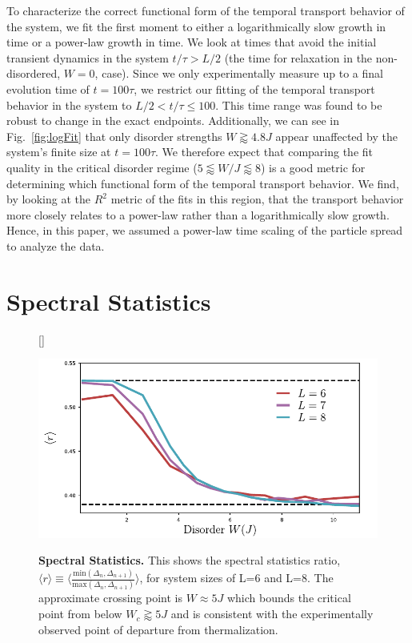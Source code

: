 To characterize the correct functional form of the temporal transport behavior of the system, we fit the first moment to either a logarithmically slow growth in time or a power-law growth in time. We look at times that avoid the initial transient dynamics in the system $t/\tau> L/2$ (the time for relaxation in the non-disordered, $W=0$, case). Since we only experimentally measure up to a final evolution time of $t=100\tau$, we restrict our fitting of the temporal transport behavior in the system to $L/2<t/\tau\leq100$. This time range was found to be robust to change in the exact endpoints. Additionally, we can see in Fig.~\ref{fig:logFit} that only disorder strengths $W\gtrapprox4.8J$ appear unaffected by the system's finite size at $t=100\tau$. We therefore expect that comparing the fit quality in the critical disorder regime ($5\lessapprox W/J \lessapprox 8$) is a good metric for determining which functional form of the temporal transport behavior. We find, by looking at the $R^2$ metric of the fits in this region, that the transport behavior more closely relates to a power-law rather than a logarithmically slow growth. Hence, in this paper, we assumed a power-law time scaling of the particle spread to analyze the data.

\section{Spectral Statistics}

\begin{figure}
[\FBwidth]
{\caption{\textbf{Spectral Statistics.} This shows the spectral statistics ratio, $\langle r \rangle \equiv \langle \frac{\mathrm{min}(\Delta_n,\Delta_{n+1})}{\mathrm{max}(\Delta_n,\Delta_{n+1})} \rangle$, for system sizes of L=6 and L=8. The approximate crossing point is $W\approx5J$ which bounds the critical point from below $W_c\gtrapprox5J$ and is consistent with the experimentally observed point of departure from thermalization.} \label{fig:RStat}}
{\includegraphics[width=4 in]{figures/ch6/figS6/RStat.pdf}} 
\end{figure}

